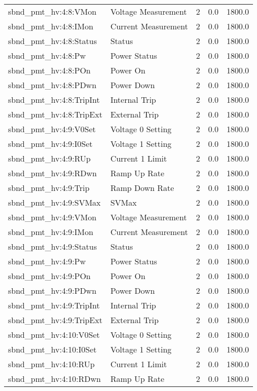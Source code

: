 \begin{center}
\begin{longtable}{l | l l l l }
sbnd\_pmt\_hv:4:8:VMon & Voltage Measurement & 2 & 0.0 & 1800.0\\ 
sbnd\_pmt\_hv:4:8:IMon & Current Measurement & 2 & 0.0 & 1800.0\\ 
sbnd\_pmt\_hv:4:8:Status & Status & 2 & 0.0 & 1800.0\\ 
sbnd\_pmt\_hv:4:8:Pw & Power Status & 2 & 0.0 & 1800.0\\ 
sbnd\_pmt\_hv:4:8:POn & Power On & 2 & 0.0 & 1800.0\\ 
sbnd\_pmt\_hv:4:8:PDwn & Power Down & 2 & 0.0 & 1800.0\\ 
sbnd\_pmt\_hv:4:8:TripInt & Internal Trip & 2 & 0.0 & 1800.0\\ 
sbnd\_pmt\_hv:4:8:TripExt & External Trip & 2 & 0.0 & 1800.0\\ 
sbnd\_pmt\_hv:4:9:V0Set & Voltage 0 Setting & 2 & 0.0 & 1800.0\\ 
sbnd\_pmt\_hv:4:9:I0Set & Voltage 1 Setting & 2 & 0.0 & 1800.0\\ 
sbnd\_pmt\_hv:4:9:RUp & Current 1 Limit & 2 & 0.0 & 1800.0\\ 
sbnd\_pmt\_hv:4:9:RDwn & Ramp Up Rate & 2 & 0.0 & 1800.0\\ 
sbnd\_pmt\_hv:4:9:Trip & Ramp Down Rate & 2 & 0.0 & 1800.0\\ 
sbnd\_pmt\_hv:4:9:SVMax & SVMax & 2 & 0.0 & 1800.0\\ 
sbnd\_pmt\_hv:4:9:VMon & Voltage Measurement & 2 & 0.0 & 1800.0\\ 
sbnd\_pmt\_hv:4:9:IMon & Current Measurement & 2 & 0.0 & 1800.0\\ 
sbnd\_pmt\_hv:4:9:Status & Status & 2 & 0.0 & 1800.0\\ 
sbnd\_pmt\_hv:4:9:Pw & Power Status & 2 & 0.0 & 1800.0\\ 
sbnd\_pmt\_hv:4:9:POn & Power On & 2 & 0.0 & 1800.0\\ 
sbnd\_pmt\_hv:4:9:PDwn & Power Down & 2 & 0.0 & 1800.0\\ 
sbnd\_pmt\_hv:4:9:TripInt & Internal Trip & 2 & 0.0 & 1800.0\\ 
sbnd\_pmt\_hv:4:9:TripExt & External Trip & 2 & 0.0 & 1800.0\\ 
sbnd\_pmt\_hv:4:10:V0Set & Voltage 0 Setting & 2 & 0.0 & 1800.0\\ 
sbnd\_pmt\_hv:4:10:I0Set & Voltage 1 Setting & 2 & 0.0 & 1800.0\\ 
sbnd\_pmt\_hv:4:10:RUp & Current 1 Limit & 2 & 0.0 & 1800.0\\ 
sbnd\_pmt\_hv:4:10:RDwn & Ramp Up Rate & 2 & 0.0 & 1800.0\\ 

\end{longtable}
\end{center}
